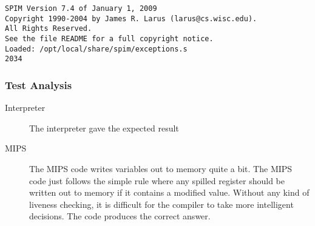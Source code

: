 \begin{verbatim}
SPIM Version 7.4 of January 1, 2009
Copyright 1990-2004 by James R. Larus (larus@cs.wisc.edu).
All Rights Reserved.
See the file README for a full copyright notice.
Loaded: /opt/local/share/spim/exceptions.s
2034
\end{verbatim}
\subsubsection{Test Analysis}
\begin{description}
	\item[Interpreter] The interpreter gave the expected result
	\item[MIPS] The MIPS code writes variables out to memory quite a bit. The MIPS code just follows the simple rule where any spilled register should be written out to memory if it contains a modified value. Without any kind of liveness checking, it is difficult for the compiler to take more intelligent decisions. The code produces the correct answer.
\end{description}